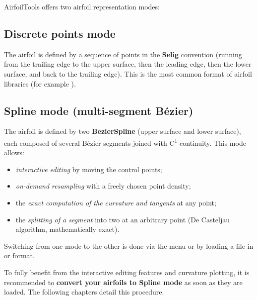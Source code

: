 AirfoilTools offers two airfoil representation modes:

\subsection*{Discrete points mode}

The airfoil is defined by a sequence of points in the
\textbf{Selig} convention (running from the trailing edge to the upper surface, then
the leading edge, then the lower surface, and back to the trailing edge).
This is the most common format of airfoil libraries
(for example ).

\subsection*{Spline mode (multi-segment Bézier)}

The airfoil is defined by two \textbf{BezierSpline} (upper surface and
lower surface), each composed of several Bézier segments
joined with C\textsuperscript{1} continuity. This mode allows:

\begin{itemize}
    \item \emph{interactive editing} by moving the
        control points;
    \item \emph{on-demand resampling} with a freely
        chosen point density;
    \item the \emph{exact computation of the curvature and tangents}
        at any point;
    \item the \emph{splitting of a segment} into two at an arbitrary point
        (De Casteljau algorithm, mathematically exact).
\end{itemize}

Switching from one mode to the other is done via the
 menu or by loading
a file in  or  format.

\begin{astuce}
To fully benefit from the interactive editing
features and curvature plotting, it is recommended
to \textbf{convert your airfoils to Spline mode} as soon as they are
loaded. The following chapters detail this procedure.
\end{astuce}
